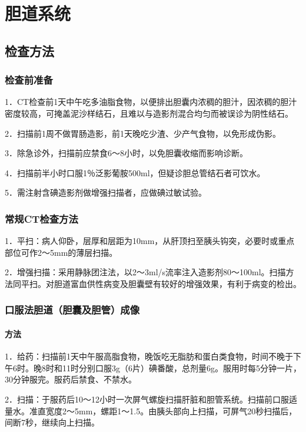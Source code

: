 \chapter{胆道系统}

\section{检查方法}

\subsection{检查前准备}

1．CT检查前1天中午吃多油脂食物，以便排出胆囊内浓稠的胆汁，因浓稠的胆汁密度较高，可掩盖泥沙样结石，且难以与造影剂混合均匀而被误诊为阴性结石。

2．扫描前1周不做胃肠造影，前1天晚吃少渣、少产气食物，以免形成伪影。

3．除急诊外，扫描前应禁食6～8小时，以免胆囊收缩而影响诊断。

4．扫描前半小时口服1％泛影葡胺500ml，但疑诊胆总管结石者可饮水。

5．需注射含碘造影剂做增强扫描者，应做碘过敏试验。

\subsection{常规CT检查方法}

1．平扫：病人仰卧，层厚和层距为10mm，从肝顶扫至胰头钩突，必要时或重点部位可作2～5mm的薄层扫描。

2．增强扫描：采用静脉团注法，以2～3ml/s流率注入造影剂80～100ml。扫描方法同平扫。对胆道富血供性病变及胆囊壁有较好的增强效果，有利于病变的检出。

\subsection{口服法胆道（胆囊及胆管）成像}

\subsubsection{方法}

1．给药：扫描前1天中午服高脂食物，晚饭吃无脂肪和蛋白类食物，时间不晚于下午6时。晚8时和11时分别口服3g（6片）碘番酸，总剂量6g。服用时每5分钟一片，30分钟服完。服药后禁食、不禁水。

2．扫描：于服药后10～12小时一次屏气螺旋扫描肝脏和胆管系统。扫描前口服适量水。准直宽度2～5mm，螺距1～1.5。由胰头部向上扫描，可屏气20秒扫描后，间断7秒，继续向上扫描。


